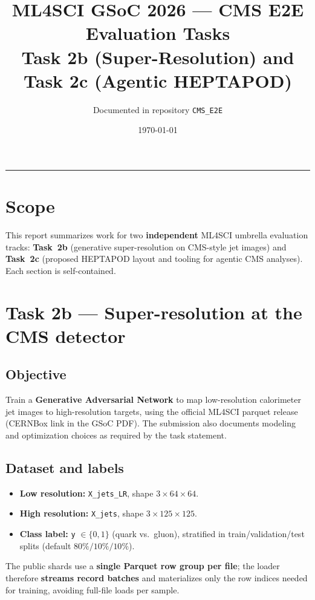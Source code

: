 \documentclass[11pt,a4paper]{article}
\title{ML4SCI GSoC 2026 --- CMS E2E Evaluation Tasks\\\large Task 2b (Super-Resolution) and Task 2c (Agentic HEPTAPOD)}
\author{Documented in repository \texttt{CMS\_E2E}}
\date{\today}
\begin{document}
\maketitle
\tableofcontents
\vspace{1em}
\hrule
\vspace{1em}

\section*{Scope}
This report summarizes work for two \textbf{independent} ML4SCI umbrella evaluation tracks: \textbf{Task~2b} (generative super-resolution on CMS-style jet images) and \textbf{Task~2c} (proposed HEPTAPOD layout and tooling for agentic CMS analyses). Each section is self-contained.

\section{Task 2b --- Super-resolution at the CMS detector}
\label{sec:2b}

\subsection{Objective}
Train a \textbf{Generative Adversarial Network} to map low-resolution calorimeter jet images to high-resolution targets, using the official ML4SCI parquet release (CERNBox link in the GSoC PDF). The submission also documents modeling and optimization choices as required by the task statement.

\subsection{Dataset and labels}
\begin{itemize}
  \item \textbf{Low resolution:} \texttt{X\_jets\_LR}, shape $3 \times 64 \times 64$.
  \item \textbf{High resolution:} \texttt{X\_jets}, shape $3 \times 125 \times 125$.
  \item \textbf{Class label:} \texttt{y} $\in \{0,1\}$ (quark vs.\ gluon), stratified in train/validation/test splits (default $80\%/10\%/10\%$).
\end{itemize}
The public shards use a \textbf{single Parquet row group per file}; the loader therefore \textbf{streams record batches} and materializes only the row indices needed for training, avoiding full-file loads per sample.
\end{document}

